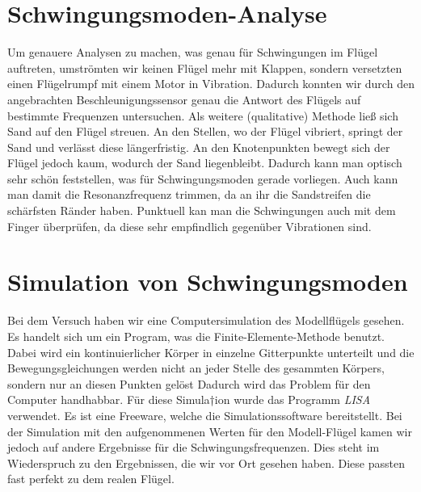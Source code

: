 \documentclass[12pt,a4paper,titlepage,headinclude,bibtotoc]{scrartcl}
\begin{document}
\section{Schwingungsmoden-Analyse}
Um genauere Analysen zu machen, was genau für Schwingungen im Flügel auftreten, umströmten wir keinen Flügel mehr mit Klappen, sondern versetzten einen Flügelrumpf mit einem Motor in Vibration.
Dadurch konnten wir durch den angebrachten Beschleunigungssensor genau die Antwort des Flügels auf bestimmte Frequenzen untersuchen.
Als weitere (qualitative) Methode ließ sich Sand auf den Flügel streuen.
An den Stellen, wo der Flügel vibriert, springt der Sand und verlässt diese längerfristig.
An den Knotenpunkten bewegt sich der Flügel jedoch kaum, wodurch der Sand liegenbleibt.
Dadurch kann man optisch sehr schön feststellen, was für Schwingungsmoden gerade vorliegen.
Auch kann man damit die Resonanzfrequenz trimmen, da an ihr die Sandstreifen die schärfsten Ränder haben.
Punktuell kan man die Schwingungen auch mit dem Finger überprüfen, da diese sehr empfindlich gegenüber Vibrationen sind.

\section{Simulation von Schwingungsmoden}
Bei dem Versuch haben wir eine Computersimulation des Modellflügels gesehen.
Es handelt sich um ein Program, was die Finite-Elemente-Methode benutzt.
Dabei wird ein kontinuierlicher Körper in einzelne Gitterpunkte unterteilt und die Bewegungsgleichungen werden nicht an jeder Stelle des gesammten Körpers, sondern nur an diesen Punkten gelöst
Dadurch wird das Problem für den Computer handhabbar.
Für diese Simula†ion wurde das Programm \textit{LISA} verwendet.
Es ist eine Freeware, welche die Simulationssoftware bereitstellt.
Bei der Simulation mit den aufgenommenen Werten für den Modell-Flügel kamen wir jedoch auf andere Ergebnisse für die Schwingungsfrequenzen.
Dies steht im Wiederspruch zu den Ergebnissen, die wir vor Ort gesehen haben.
Diese passten fast perfekt zu dem realen Flügel.
\end{document}
